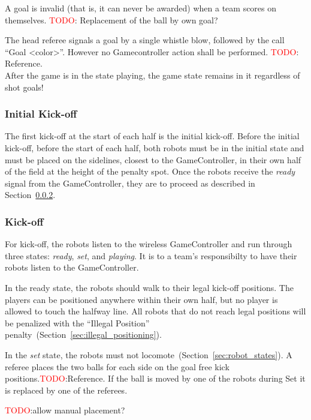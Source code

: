 \label{sec:invalid_goal}
A goal is invalid (that is, it can never be awarded) when a team scores on themselves.
\textcolor{red}{TODO}: Replacement of the ball by own goal?

The head referee signals a goal by a single whistle blow, followed by the call ``Goal \textless color\textgreater''. However no Gamecontroller action shall be performed. \textcolor{red}{TODO}: Reference. \\
After the game is in the state playing, the game state remains in it regardless of shot goals!


\subsubsection{Initial Kick-off}
\label{sec:initial-kick-off}

The first kick-off at the start of each half is the initial kick-off.
Before the initial kick-off, \ie before the start of each half, both robots must be in the initial state and must be placed on the sidelines, closest to the GameController, in their own half of the field at the height of the penalty spot. 
Once the robots receive the \emph{ready} signal from the GameController, they are to proceed as described in Section~\ref{sec:kick-off}.

\subsubsection{Kick-off}
\label{sec:kick-off}
For kick-off, the robots listen to the wireless GameController and run through three states: \emph{ready}, \emph{set}, and \emph{playing}. It is to a team's responsibilty to have their robots listen to the GameController.

In the ready state, the robots should walk to their legal kick-off positions.
The players can be positioned anywhere within their own half, but no player is allowed to touch the halfway line. All robots that do not reach legal positions will be penalized with the ``Illegal Position'' penalty~(\cf Section~\ref{sec:illegal_positioning}).

In the \emph{set} state, the robots must not locomote~(\cf Section~\ref{sec:robot_states}). A referee places the two balls for each side on the goal free kick positions.\textcolor{red}{TODO}:Reference. If the ball is moved by one of the robots during Set it is replaced by one of the referees.

\textcolor{red}{TODO}:allow manual placement?

